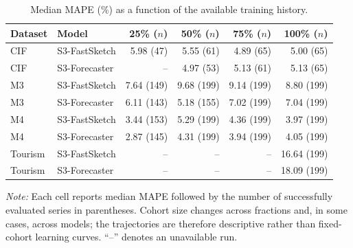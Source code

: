 \begin{table}[t]
\centering
\caption{Median MAPE (\%) as a function of the available training history.}
\label{tab:data_efficiency_phase1}
\footnotesize
\setlength{\tabcolsep}{4pt}
\begin{tabular}{llrrrr}
\toprule
Dataset & Model & 25\% ($n$) & 50\% ($n$) & 75\% ($n$) & 100\% ($n$) \\
\midrule
CIF & S3-FastSketch & 5.98 (47) & 5.55 (61) & 4.89 (65) & 5.00 (65) \\
CIF & S3-Forecaster & -- & 4.97 (53) & 5.13 (61) & 5.13 (65) \\
M3 & S3-FastSketch & 7.64 (149) & 9.68 (199) & 9.14 (199) & 8.80 (199) \\
M3 & S3-Forecaster & 6.11 (143) & 5.18 (155) & 7.02 (199) & 7.04 (199) \\
M4 & S3-FastSketch & 3.44 (153) & 5.29 (199) & 4.36 (199) & 3.97 (199) \\
M4 & S3-Forecaster & 2.87 (145) & 4.31 (199) & 3.94 (199) & 4.05 (199) \\
Tourism & S3-FastSketch & -- & -- & -- & 16.64 (199) \\
Tourism & S3-Forecaster & -- & -- & -- & 18.09 (199) \\
\bottomrule
\end{tabular}
\begin{minipage}{0.96\linewidth}
\footnotesize\emph{Note:} Each cell reports median MAPE followed by the number of successfully evaluated series in parentheses. Cohort size changes across fractions and, in some cases, across models; the trajectories are therefore descriptive rather than fixed-cohort learning curves. ``--'' denotes an unavailable run.
\end{minipage}
\end{table}
